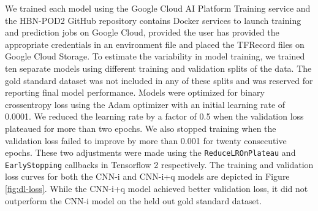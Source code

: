 \documentclass[fleqn,10pt]{wlscirep}
\begin{document}
We trained each model using the Google Cloud AI Platform Training service and
the HBN-POD2 GitHub repository contains Docker services to launch training and
prediction jobs on Google Cloud, provided the user has provided the appropriate
credentials in an environment file and placed the TFRecord files on Google Cloud
Storage. To estimate the variability in model training, we trained ten separate
models using different training and validation splits of the data. The gold
standard dataset was not included in any of these splits and was reserved for
reporting final model performance. Models were optimized for binary crossentropy
loss using the Adam optimizer \cite{kingma2017adam} with an initial learning
rate of 0.0001. We reduced the learning rate by a factor of 0.5 when the
validation loss plateaued for more than two epochs. We also stopped training
when the validation loss failed to improve by more than 0.001 for twenty
consecutive epochs.  These two adjustments were made using the
\texttt{ReduceLROnPlateau} and \texttt{EarlyStopping} callbacks in Tensorflow 2
\cite{tensorflow} respectively. The training and validation loss curves for both
the CNN-i and CNN-i+q models are depicted in Figure \ref{fig:dl-loss}. While the
CNN-i+q model achieved better validation loss, it did not outperform the CNN-i
model on the held out gold standard dataset.
\end{document}
